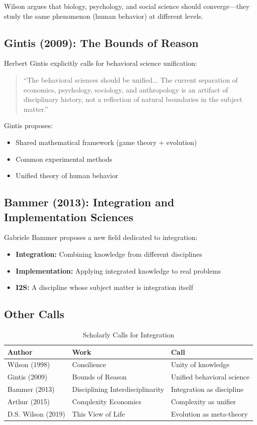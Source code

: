 \documentclass[12pt,a4paper]{article}
\begin{document}
Wilson argues that biology, psychology, and social science should converge---they study the same phenomenon (human behavior) at different levels.

\subsection{Gintis (2009): The Bounds of Reason}

Herbert Gintis explicitly calls for behavioral science unification:
\begin{quote}
``The behavioral sciences should be unified... The current separation of economics, psychology, sociology, and anthropology is an artifact of disciplinary history, not a reflection of natural boundaries in the subject matter.''
\end{quote}

Gintis proposes:
\begin{itemize}
\item Shared mathematical framework (game theory + evolution)
\item Common experimental methods
\item Unified theory of human behavior
\end{itemize}

\subsection{Bammer (2013): Integration and Implementation Sciences}

Gabriele Bammer proposes a new field dedicated to integration:
\begin{itemize}
\item \textbf{Integration:} Combining knowledge from different disciplines
\item \textbf{Implementation:} Applying integrated knowledge to real problems
\item \textbf{I2S:} A discipline whose subject matter is integration itself
\end{itemize}

\subsection{Other Calls}

\begin{table}[H]
\centering
\caption{Scholarly Calls for Integration}
\label{tab:calls}
\renewcommand{\arraystretch}{1.3}
\begin{tabular}{@{}lll@{}}
\toprule
\textbf{Author} & \textbf{Work} & \textbf{Call} \\
\midrule
Wilson (1998) & Consilience & Unity of knowledge \\
Gintis (2009) & Bounds of Reason & Unified behavioral science \\
Bammer (2013) & Disciplining Interdisciplinarity & Integration as discipline \\
Arthur (2015) & Complexity Economics & Complexity as unifier \\
D.S. Wilson (2019) & This View of Life & Evolution as meta-theory \\
\bottomrule
\end{tabular}
\end{table}
\end{document}
